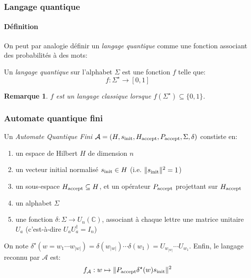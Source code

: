\documentclass[aspectratio=169]{beamer}
\theoremstyle{plain}
\newtheorem*{remark}{Remarque}
\theoremstyle{definition}
\begin{document}
\begin{frame}
    \frametitle{Langage quantique}
    \framesubtitle{Définition}
    On peut par analogie définir un \emph{langage quantique} comme une fonction associant des probabilités à des mots:
    \begin{definition}
        Un \emph{langage quantique} sur l'alphabet $\Sigma$ est une fonction $f$ telle que:
        \begin{equation*}
            f : \Sigma^\star \to [0, 1]
        \end{equation*}
        
    \end{definition}

    \begin{remark}
        $f$ est un langage classique lorsque $f(\Sigma^\star) \subseteq \{0, 1\}$.
    \end{remark}
\end{frame}

\begin{frame}
    \frametitle{Automate quantique fini}
    \begin{definition}[AQF]
        Un \emph{Automate Quantique Fini} $\mathcal{A}=(H, s_{\textnormal{init}}, H_{\textnormal{accept}}, P_{\textnormal{accept}}, \Sigma, \delta)$ constiste en:
        \begin{enumerate}[label=--, noitemsep]
            \item un espace de Hilbert $H$ de dimension $n$
            \item un vecteur initial normalisé $s_{\textnormal{init}}\in H$ (i.e. $\|s_{\textnormal{init}}\|^2=1$)
            \item un sous-espace $H_{\textnormal{accept}} \subseteq H$, et un opérateur $P_{\textnormal{accept}}$ projettant sur $H_{\textnormal{accept}}$
            \item un alphabet $\Sigma$
            \item une fonction $\delta : \Sigma \to U_n(\mathbb{C})$, associant à chaque lettre une matrice unitaire $U_a$ (c'est-à-dire $U_aU_a^\dagger = I_n$)
        \end{enumerate}
        
        On note $\delta^\star(w=w_1\cdots w_{|w|}) = \delta(w_{|w|})\cdots \delta(w_1) = U_{w_{|w|}}\cdots U_{w_1}$. Enfin, le langage reconnu par $\mathcal{A}$ est:
        \begin{equation*}
            f_{\mathcal{A}} : w \mapsto \|P_{\textnormal{accept}}\delta^\star(w)s_{\textnormal{init}}\|^2
        \end{equation*}
    \end{definition}
\end{frame}
\end{document}
